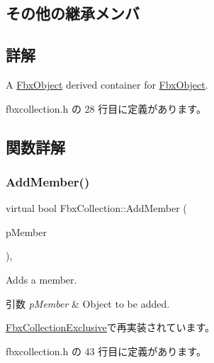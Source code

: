 \subsection*{その他の継承メンバ}


\subsection{詳解}
A \hyperlink{class_fbx_object}{Fbx\+Object} derived container for \hyperlink{class_fbx_object}{Fbx\+Object}. 

 fbxcollection.\+h の 28 行目に定義があります。



\subsection{関数詳解}
\mbox{\label{class_fbx_collection_a8f9bfa57454dda20ef75dd4f27761a15}} 
\subsubsection{\texorpdfstring{Add\+Member()}{AddMember()}}
{\footnotesize\ttfamily virtual bool Fbx\+Collection\+::\+Add\+Member (\begin{DoxyParamCaption}\item[{\hyperlink{class_fbx_object}{Fbx\+Object} $\ast$}]{p\+Member }\end{DoxyParamCaption})\hspace{0.3cm}{\ttfamily [inline]}, {\ttfamily [virtual]}}

Adds a member. 
\begin{DoxyParams}{引数}
{\em p\+Member} & Object to be added. \\
\hline
\end{DoxyParams}


\hyperlink{class_fbx_collection_exclusive_ab39aa1d3200f5cc628685d7c9eca6fb2}{Fbx\+Collection\+Exclusive}で再実装されています。



 fbxcollection.\+h の 43 行目に定義があります。

\mbox{\label{class_fbx_collection_a79ba35ab4693cd1b1c79a221d7d2f8d3}} 
